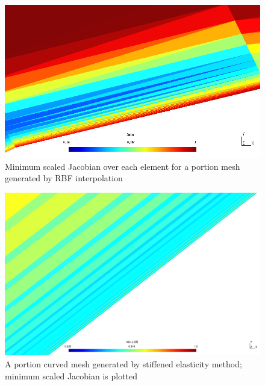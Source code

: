 \documentclass[t,12pt]{beamer}
\begin{document}
\begin{frame}
	\begin{figure}
		\centering
		\includegraphics[scale=0.3]{3comp-rbf-zoomed-jacobians2.png}
		\caption{Minimum scaled Jacobian over each element for a portion mesh generated by RBF interpolation}
		\label{fig:rbf-jacobians}
	\end{figure}
\end{frame}
\begin{frame}
\begin{figure}
	\centering
	\includegraphics[scale=0.2]{3comp_curved_elaststiff_vzoomed_jac}
	\caption{A portion curved mesh generated by stiffened elasticity method; minimum scaled Jacobian is plotted}
	\label{fig:3compstiffelastjac}
\end{figure}
\end{frame}
\end{document}
